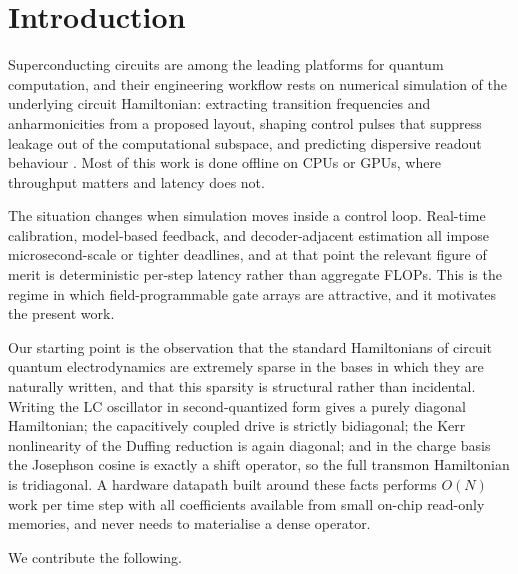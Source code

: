 \documentclass[smallextended]{svjour3}
\begin{document}

\section{Introduction}
\label{sec:intro}

Superconducting circuits are among the leading platforms for quantum computation, and
their engineering workflow rests on numerical simulation of the underlying circuit
Hamiltonian: extracting transition frequencies and anharmonicities from a proposed
layout, shaping control pulses that suppress leakage out of the computational subspace,
and predicting dispersive readout behaviour \cite{blais2021,krantz2019}. Most of this
work is done offline on CPUs or GPUs, where throughput matters and latency does not.

The situation changes when simulation moves inside a control loop. Real-time
calibration, model-based feedback, and decoder-adjacent estimation all impose
microsecond-scale or tighter deadlines, and at that point the relevant figure of merit
is deterministic per-step latency rather than aggregate FLOPs. This is the regime in
which field-programmable gate arrays are attractive, and it motivates the present work.

Our starting point is the observation that the standard Hamiltonians of circuit quantum
electrodynamics are extremely sparse in the bases in which they are naturally written,
and that this sparsity is structural rather than incidental. Writing the LC oscillator
in second-quantized form gives a purely diagonal Hamiltonian; the capacitively coupled
drive is strictly bidiagonal; the Kerr nonlinearity of the Duffing reduction is again
diagonal; and in the charge basis the Josephson cosine is exactly a shift operator, so
the full transmon Hamiltonian is tridiagonal. A hardware datapath built around these
facts performs $O(N)$ work per time step with all coefficients available from small
on-chip read-only memories, and never needs to materialise a dense operator.

We contribute the following.
\end{document}
